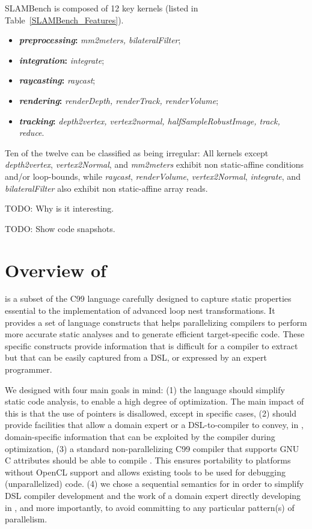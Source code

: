 \documentclass{llncs}
\begin{document}
SLAMBench is composed of 12 key kernels (listed in
Table~\ref{SLAMBench_Features}). 

\begin{itemize}
\item \textbf{\textit{preprocessing}:} \textit{mm2meters, bilateralFilter};
\item \textbf{\textit{integration}:} \textit{integrate};
\item \textbf{\textit{raycasting}:} \textit{raycast};
\item \textbf{\textit{rendering}:} \textit{renderDepth, renderTrack, renderVolume};
\item \textbf{\textit{tracking}:} \textit{depth2vertex, vertex2normal,
      halfSampleRobustImage, track, reduce}.
\end{itemize}

Ten of the twelve can be classified as being irregular:
All kernels except \textit{depth2vertex}, \textit{vertex2Normal},
and \textit{mm2meters} exhibit non static-affine conditions and/or
loop-bounds, while \textit{raycast}, \textit{renderVolume},
\textit{vertex2Normal}, \textit{integrate}, and
\textit{bilateralFilter} also exhibit non static-affine array reads.


TODO: Why is it interesting.


TODO: Show code snapshots.


\section{Overview of \pencil{}}

\pencil is a subset of the C99 language carefully designed to
capture static properties essential to the implementation of advanced
loop nest transformations.  It provides a set of language constructs
that helps parallelizing compilers to perform more accurate static
analyses and to generate efficient target-specific code.  These
specific constructs provide information that is difficult for a
compiler to extract but that can be easily captured from a DSL, or
expressed by an expert programmer.

We designed \pencil with four main goals in mind:
(1) the language should simplify static code analysis,
to enable a high degree of optimization.
The main impact of this is that the use of pointers is
disallowed, except in specific cases,
(2) \pencil should provide facilities that allow a domain
expert or a DSL-to-\pencil compiler to convey, in \pencil,
domain-specific information that can be exploited by the \pencil
compiler during optimization,
(3) a standard non-parallelizing C99 compiler that supports
GNU C attributes should be able to compile \pencil.
This ensures portability to platforms without OpenCL support and allows
existing tools to be used for debugging (unparallelized) \pencil code.
(4) we chose a sequential semantics for \pencil in order to simplify
DSL compiler development and the work of a domain expert directly
developing in \pencil, and more importantly, to avoid committing
to any particular pattern(s) of parallelism.
  
\end{document}

